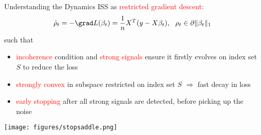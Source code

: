 \documentclass[slidestop,compress,9pt,epsfig,color]{beamer}
\theoremstyle{example}
\begin{document}
\begin{frame}{Understanding the Dynamics}
ISS as \textcolor{red}{restricted gradient descent}:
\[ \dot \rho_t = -\grad L(\beta_t)=\frac{1}{n} X^T ( y - X \beta_t) , \ \ \rho_t \in \partial \|\beta_t\|_1\]
such that
\begin{itemize}
\item \textcolor{red}{incoherence} condition and \textcolor{red}{strong signals} ensure it firstly evolves on index set $S$ to reduce the loss
\item \textcolor{red}{strongly convex} in subspace restricted on index set $S$ $\Rightarrow$ fast decay in loss
\item \textcolor{red}{early stopping} after all strong signals are detected, before picking up the noise
\end{itemize}
\centering
    \texttt{[image: figures/stopsaddle.png]}
\end{frame}


%
\end{document}
